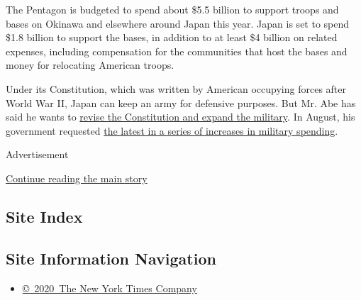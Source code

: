 The Pentagon is budgeted to spend about \$5.5 billion to support troops
and bases on Okinawa and elsewhere around Japan this year. Japan is set
to spend \$1.8 billion to support the bases, in addition to at least \$4
billion on related expenses, including compensation for the communities
that host the bases and money for relocating American troops.

Under its Constitution, which was written by American occupying forces
after World War II, Japan can keep an army for defensive purposes. But
Mr. Abe has said he wants to
\href{http://www.nytimes.com/2016/07/12/world/asia/japan-election-shinzo-abe.html}{revise
the Constitution and expand the military}. In August, his government
requested
\href{http://www.nytimes.com/2016/08/31/world/asia/japan-defense-military-budget-shinzo-abe.html}{the
latest in a series of increases in military spending}.

Advertisement

\protect\hyperlink{after-bottom}{Continue reading the main story}

\hypertarget{site-index}{%
\subsection{Site Index}\label{site-index}}

\hypertarget{site-information-navigation}{%
\subsection{Site Information
Navigation}\label{site-information-navigation}}

\begin{itemize}
\tightlist
\item
  \href{https://help.nytimes.com/hc/en-us/articles/115014792127-Copyright-notice}{©~2020~The
  New York Times Company}
\end{itemize}

